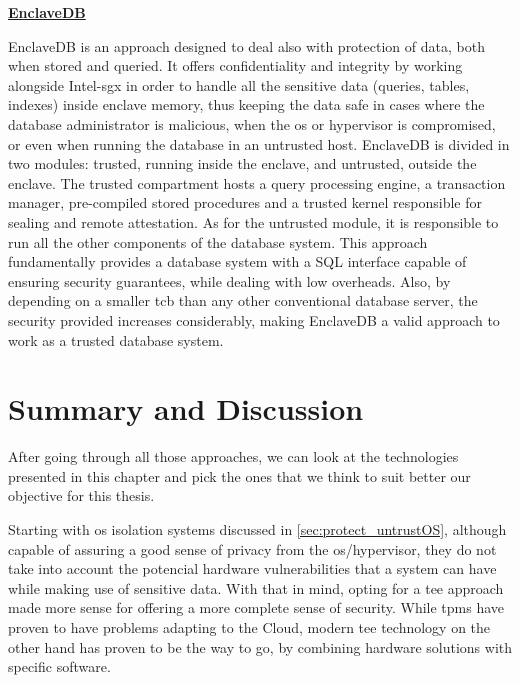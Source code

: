 
\underline{\textbf{EnclaveDB}}

EnclaveDB \cite{enclavedbPaper} is an approach designed to deal also with protection of data, both when stored and queried. It offers confidentiality and integrity by working alongside Intel-\gls{sgx} in order to handle all the sensitive data (queries, tables, indexes) inside enclave memory, thus keeping the data safe in cases  where the database administrator is malicious, when the \gls{os} or hypervisor is compromised, or even when running the database in an untrusted host. 
EnclaveDB is divided in two modules: trusted, running inside the enclave, and untrusted, outside the enclave. The trusted compartment hosts a query processing engine, a transaction manager, pre-compiled stored procedures and a trusted kernel responsible for sealing and remote attestation. As for the untrusted module, it is responsible to run all the other components of the database system. 
This approach fundamentally provides a database system with a SQL interface capable of ensuring security guarantees, while dealing with low overheads. Also, by depending on a smaller \gls{tcb} than any other conventional database server, the security provided increases considerably, making EnclaveDB a valid approach to work as a trusted database system.




\section{Summary and Discussion}
\label{sec:summary}


After going through all those approaches, we can look at the technologies presented in this chapter and pick the ones that we think to suit better our objective for this thesis. 

Starting with \gls{os} isolation systems discussed in \ref{sec:protect_untrustOS}, although capable of assuring a good sense of privacy from the \gls{os}/hypervisor, they do not take into account the potencial hardware vulnerabilities that a system can have while making use of sensitive data. 
With that in mind, opting for a \gls{tee} approach made more sense for offering a more complete sense of security.
While \gls{tpm}s have proven to have problems adapting to the Cloud, modern \gls{tee} technology on the other hand has proven to be the way to go, by combining hardware solutions with specific software.

